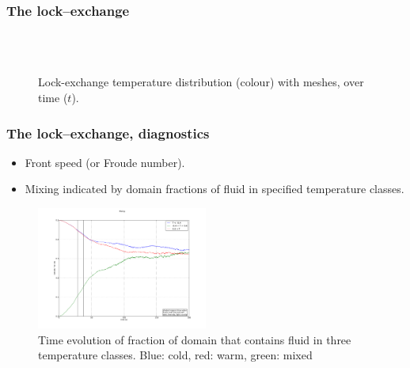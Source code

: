 \begin{frame}
  \frametitle{The lock--exchange}
  \begin{figure}[ht]
    \centering
     \\
     \\
    \caption{Lock-exchange temperature distribution (colour) with meshes, over time ($t$).}
  \end{figure}
\end{frame}
 
\begin{frame}
  \frametitle{The lock--exchange, diagnostics}
  \begin{itemize}
  \item Front speed (or Froude number).
  \item Mixing indicated by domain fractions of fluid in specified temperature classes.
  \end{itemize}

  \begin{figure}
    \centering
    \includegraphics[width=0.5\textwidth]{./lock_exchange/mixing}
    \caption{Time evolution of fraction of domain that contains fluid in three temperature classes. Blue: cold, red: warm, green: mixed}
  \end{figure}
\end{frame} 

